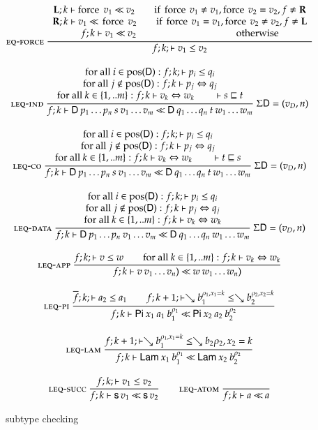 \begin{figure}
\begin{gather*}
\mbox{\sc eq-force}\ \dfrac{\begin{array}[b]{c}\mathbf{L};k\vdash\operatorname{force} \; v_1{\:\ll\:}v_2 \qquad \mbox{if } \operatorname{force} \: v_1 \neq v_1 , \operatorname{force} \: v_2 = v_2  , f \neq \mathbf{R}
\\\mathbf{R};k\vdash v_1{\:\ll\:}\operatorname{force} \; v_2 \qquad \mbox{if } \operatorname{force} \: v_1 = v_1 , \operatorname{force} \: v_2 \neq v_2 , f \neq \mathbf{L} \\f;k\vdash v_1{\:\ll\:}v_2 \qquad \qquad \qquad \qquad \qquad \mbox{ otherwise}\end{array}}{f;k;\vdash v_1\leq v_2}
\\[2ex]
\mbox{\sc leq-ind}\ \dfrac{\begin{array}[b]{c}\mbox{for all } i \in \mbox{pos}(\mathsf{D}): f;k;\vdash p_i\leq q_i 
\\
\mbox{for all } j \notin \mbox{pos}(\mathsf{D}): f;k\vdash p_j\Leftrightarrow q_j 
\\\mbox{for all } k \in \{1,..m\}: f;k\vdash v_k\Leftrightarrow w_k
\qquad
\vdash s\sqsubseteq t \end{array}}{f;k\vdash\mathsf{D} \: p_1 \ldots p_n \: s \: v_1 \ldots v_m{\:\ll\:}\mathsf{D} \: q_1 \ldots q_n \: t \: w_1 \ldots w_m}
{\: \Sigma \mathsf{D} = (v_D,n)}
\\[2ex]
\mbox{\sc leq-co}\ \dfrac{\begin{array}[b]{c}\mbox{for all } i \in \mbox{pos}(\mathsf{D}): f;k;\vdash p_i\leq q_i 
\\
\mbox{for all } j \notin \mbox{pos}(\mathsf{D}): f;k\vdash p_j\Leftrightarrow q_j
\\\mbox{for all } k \in \{1,..m\}:f;k\vdash v_k\Leftrightarrow w_k
\qquad
\vdash t\sqsubseteq s \end{array}}{f;k\vdash\mathsf{D} \: p_1 \ldots p_n \: s \: v_1 \ldots v_m{\:\ll\:}\mathsf{D} \: q_1 \ldots q_n \: t \: w_1 \ldots w_m}
{\: \Sigma \mathsf{D} = (v_D,n)} 
\\[2ex]
\mbox{\sc leq-data}\ \dfrac{\begin{array}[b]{c}\mbox{for all } i \in \mbox{pos}(\mathsf{D}): f;k;\vdash p_i\leq q_i 
\\
\mbox{for all } j \notin \mbox{pos}(\mathsf{D}): f;k\vdash p_j\Leftrightarrow q_j\\\mbox{for all } k \in \{1,..m\}:f;k\vdash v_k\Leftrightarrow w_k\end{array}}{f;k\vdash\mathsf{D} \: p_1 \ldots p_n \: v_1 \ldots v_m{\:\ll\:}\mathsf{D} \: q_1 \ldots q_n \: w_1 \ldots w_m}
{\:\Sigma \mathsf{D} = (v_D,n) }
\\[2ex]
\mbox{\sc leq-app}\ \dfrac{f;k;\vdash v\leq w \qquad
\mbox{for all } k \in \{1,..m\}:f;k\vdash v_k\Leftrightarrow w_k}{f;k\vdash v \: v_1 \ldots v_n){\:\ll\:}w \: w_1 \ldots w_n)}
\\[2ex]
\mbox{\sc leq-pi}\ \dfrac{\overline{f};k;\vdash a_2\leq a_1
\qquad
f;k+1;\vdash\searrow b_1^{\rho_1,x_1=k}\leq\searrow b_2^{\rho_2,x_2=k}}{f;k\vdash\mathsf{Pi} \: x_1 \: a_1 \: b_1^{\rho_1}{\:\ll\:}\mathsf{Pi} \: x_2 \: a_2 \: b_2^{\rho_2}}
\\[2ex]
\mbox{\sc leq-lam}\ \dfrac{f;k+1;\vdash\searrow b_1^{\rho_1,x_1=k}\leq\searrow{b_2}{\rho_2,x_2=k}}{f;k\vdash\mathsf{Lam} \: x_1 \: b_1^{\rho_1}{\:\ll\:}\mathsf{Lam} \: x_2 \: b_2^{\rho_2}}
\\[2ex]
\mbox{\sc leq-succ}\ \dfrac{f;k;\vdash v_1\leq v_2}{f;k\vdash\mathsf{s}\, v_1{\:\ll\:}\mathsf{s}\, v_2}
\qquad
\mbox{\sc leq-atom}\ \dfrac{}{f;k\vdash a{\:\ll\:}a}
\end{gather*}
\caption{subtype checking}
\end{figure}

